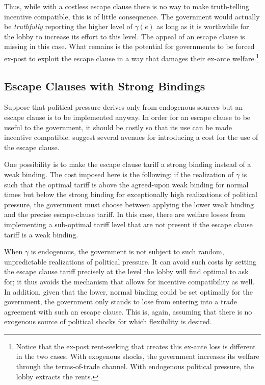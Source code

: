 \documentclass[12pt]{article}
\newcommand{\ga}{\gamma}
\begin{document}
Thus, while with a costless escape clause there is no way to make truth-telling incentive compatible, this is of little consequence. The government would actually be \textit{truthfully} reporting the higher level of $\ga(e)$ as long as it is worthwhile for the lobby to increase its effort to this level. The appeal of an escape clause is missing in this case. What remains is the potential for governments to be forced ex-post to exploit the escape clause in a way that damages their ex-ante welfare.\footnote{Notice that the ex-post rent-seeking that creates this ex-ante loss is different in the two cases. With exogenous shocks, the government increases its welfare through the terms-of-trade channel. With endogenous political pressure, the lobby extracts the rents.}

\subsection{Escape Clauses with Strong Bindings}
\label{sec:strong}
Suppose that political pressure derives only from endogenous sources but an escape clause is to be implemented anyway. In order for an escape clause to be useful to the government, it should be costly so that its use can be made incentive compatible. \Textcite{bs2005}  suggest several avenues for introducing a cost for the use of the escape clause.

One possibility is to make the escape clause tariff a strong binding instead of a weak binding. The cost imposed here is the following: if the realization of $\ga$ is such that the optimal tariff is above the agreed-upon weak binding for normal times but below the strong binding for exceptionally high realizations of political pressure, the government must choose between applying the lower weak binding and the precise escape-clause tariff. In this case, there are welfare losses from implementing a sub-optimal tariff level that are not present if the escape clause tariff is a weak binding.

When $\ga$ is endogenous, the government is not subject to such random, unpredictable realizations of political pressure. It can avoid such costs by setting the escape clause tariff precisely at the level the lobby will find optimal to ask for; it thus avoids the mechanism that allows for incentive compatibility as well. In addition, given that the lower, normal binding could be set optimally for the government, the government only stands to lose from entering into a trade agreement with such an escape clause. This is, again, assuming that there is no exogenous source of political shocks for which flexibility is desired.
\end{document}
